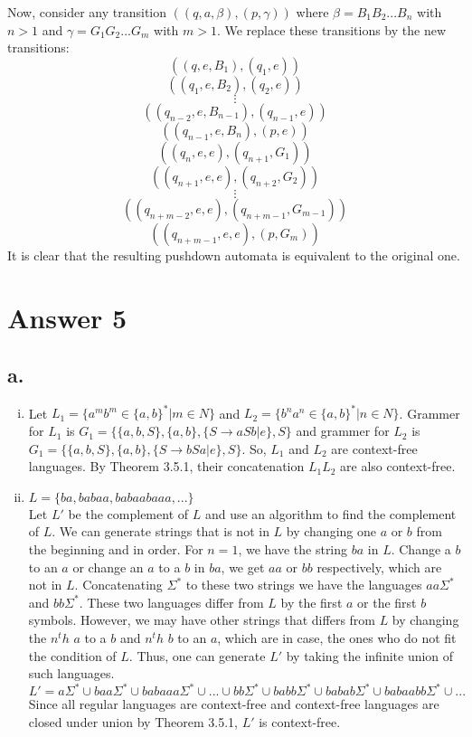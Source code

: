 \documentclass[12pt]{article}
\begin{document}
Now, consider any transition $((q,a,\beta),(p,\gamma))$ where $\beta=B_1B_2...B_n$ with $n>1$ and $\gamma=G_1G_2...G_m$ with $m>1$. We replace these transitions by the new transitions:
$$((q,e,B_1),(q_1,e))$$
$$((q_1,e,B_2),(q_2,e))$$
$$\vdots$$
$$((q_{n-2},e,B_{n-1}),(q_{n-1},e))$$
$$((q_{n-1},e,B_n),(p,e))$$
$$((q_n,e,e),(q_{n+1},G_1))$$
$$((q_{n+1},e,e),(q_{n+2},G_2))$$
$$\vdots$$
$$((q_{n+m-2},e,e),(q_{n+m-1},G_{m-1}))$$
$$((q_{n+m-1},e,e),(p,G_m))$$
It is clear that the resulting pushdown automata is equivalent to the original one.

\section*{Answer 5}

\subsection*{a.}
\begin{enumerate}[(i)]
\item 
Let $L_1=\{a^m b^m \in \{a,b\}^* |m\in N\}$ and $L_2=\{b^n a^n \in \{a,b\}^* |n\in N\}$. Grammer for $L_1$ is $G_1=\{\{a,b,S\},\{a,b\}, \{S\rightarrow aSb|e\},S\}$ and grammer for $L_2$ is $G_1=\{\{a,b,S\},\{a,b\}, \{S\rightarrow bSa|e\},S\}$. So, $L_1$ and $L_2$ are context-free languages. By Theorem 3.5.1, their concatenation $L_1L_2$ are also context-free.

\item 
$L=\{ba,babaa,babaabaaa,...\}$\\
Let $L'$ be the complement of $L$ and use an algorithm to find the complement of $L$. We can generate strings that is not in $L$ by changing one $a$ or $b$ from the beginning and in order. For $n=1$, we have the string $ba$ in $L$. Change a $b$ to an $a$ or change an $a$ to a $b$ in $ba$, we get $aa$ or $bb$ respectively, which are not in $L$. Concatenating $\Sigma^*$ to these two strings we have the languages $aa\Sigma^*$ and $bb\Sigma^*$. These two languages differ from $L$ by the first $a$ or the first $b$ symbols. However, we may have other strings that differs from $L$ by changing the $n^th$ $a$ to a $b$ and $n^th$ $b$ to an $a$, which are in case, the ones who do not fit the condition of $L$. Thus, one can generate $L'$ by taking the infinite union of such languages.
$$L'=a\Sigma^*\cup baa\Sigma^*\cup babaaa\Sigma^*\cup ...\cup bb\Sigma^*\cup babb\Sigma^*\cup babab\Sigma^*\cup babaabb\Sigma^*\cup ...$$
Since all regular languages are context-free and context-free languages are closed under union by Theorem 3.5.1, $L'$ is context-free.
\end{enumerate}
\end{document}

